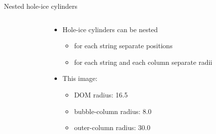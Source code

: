
\begin{frame}[fragile]{Nested hole-ice cylinders}

  \begin{columns}
    \begin{column}{0.5\textwidth}


    \end{column}
    \begin{column}{0.5\textwidth}

      \begin{itemize}
        \item Hole-ice cylinders can be nested
          \begin{itemize}
            \item for each string separate positions
            \item for each string and each column separate radii
          \end{itemize}
        \item This image:
          \begin{itemize}
            \item DOM radius: 16.5\cm
            \item bubble-column radius: 8.0\cm
            \item outer-column radius: 30.0\cm
          \end{itemize}
      \end{itemize}


    \end{column}
  \end{columns}

\end{frame}
